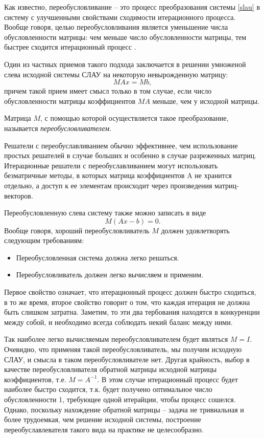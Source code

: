 \documentclass[a4paper,14pt]{extreport}
\begin{document}
	Как известно, переобусловливание -- это процесс преобразования системы \eqref{slau}  в систему с улучшенными свойствами сходимости итерационного процесса. Вообще говоря, целью переобусловливания является уменьшение числа обусловленности матрицы: чем меньше число обусловленности матрицы, тем быстрее сходится итерационный процесс \cite{benzi}.
	
	Один из частных приемов такого подхода	заключается в решении умноженой слева исходной системы СЛАУ на некоторую невырожденную матрицу:
	\begin{equation}
	\label{precondslau1}
	MAx=Mb,
	\end{equation}
причем такой прием имеет смысл только в том случае, если число обусловленности матрицы коэффициентов $MA$ меньше, чем у исходной матрицы.	
	
	Матрица $M$, с помощью которой осуществляется такое преобразование, называется \textit{переобусловливателем}. 
  
  Решатели с переобуславливанием обычно эффективнее, чем использование простых решателей в случае больших и особенно в случае разреженных матриц. Итерационные решатели с переобуславливанием могут использовать безматричные методы, в которых матрица коэффициентов A не хранится отдельно, а доступ к ее элементам происходит через произведения матриц-векторов\cite{wiki-precond}.
  
  Переобусловленную слева систему также можно записать в виде 
  \begin{equation}
	\label{precondslau2}
	M(Ax-b)=0.
	\end{equation}
 Вообще говоря, хороший переобусловливатель $M$ должен удовлетворять следующим требованиям:	
 \begin{itemize}
 \item Переобусловленная система должна легко решаться.
 \item Переобусловливатель должен легко вычисляем и применим\cite{benzi}.
 \end{itemize}
 Первое свойство означает, что итерационный процесс должен быстро сходиться, в то же время, второе свойство говорит о том, что каждая итерация не должна быть слишком затратна. Заметим, то эти два тербования находятся в конкуренции между собой, и необходимо всегда соблюдать некий баланс между ними.
 
 Так наиболее легко вычисляемым переобусловливателем будет являться $M = I$. Очевидно, что применяя такой переобусловливатель, мы получим исходную СЛАУ, и смысла в таком переобусловливателе нет. Другая крайность, выбор в качестве переобусловливателя обратной матрицы исходной матрицы коэффициентов, т.е. $M = A^{-1}$. В этом случае итерационный процесс будет наиболее быстро сходится, т.к. будет получено оптимальное число обусловленности 1, требующее одной итерайции, чтобы процесс сошелся. Однако, поскольку нахождение обратной матрицы -- задача не тривиальная и более трудоемкая, чем решение исходной системы, построение переобуславлевателя такого вида на практике не целесообразно.  
	
\end{document}
